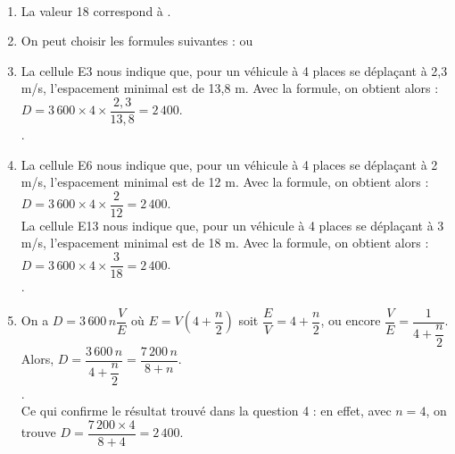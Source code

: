 \ \\ [-5mm]
\begin{enumerate}
   \item La valeur 18 correspond à .
   \item On peut choisir les formules suivantes :  ou 
   \item La cellule E3 nous indique que, pour un véhicule à 4 places se déplaçant à 2,3 m/s, l'espacement minimal est de 13,8 m. Avec la formule, on obtient alors : $D =3\,600\times4\times\dfrac{2,3}{13,8} =2\,400$. \\
   .
   \item La cellule E6 nous indique que, pour un véhicule à 4 places se déplaçant à 2 m/s, l'espacement minimal est de 12 m. Avec la formule, on obtient alors : $D =3\,600\times4\times\dfrac{2}{12} =2\,400$. \\
   La cellule E13 nous indique que, pour un véhicule à 4 places se déplaçant à 3 m/s, l'espacement minimal est de 18 m. Avec la formule, on obtient alors : $D =3\,600\times4\times\dfrac{3}{18} =2\,400$. \\ [1mm]
   .
   \item On a $D =3\,600\,n\dfrac{V}{E}$ où $E =V\left(4+\dfrac{n}{2}\right)$ soit $\dfrac{E}{V} =4+\dfrac{n}{2}$, ou encore $\dfrac{V}{E} =\dfrac{1}{4+\dfrac{n}{2}}$. \\
   Alors, $D =\dfrac{3\,600\,n}{4+\dfrac{n}{2}} =\dfrac{7\,200\,n}{8+n}$. \\ [1mm]
   . \\
   Ce qui confirme le résultat trouvé dans la question 4 : en effet, avec $n=4$, on trouve $D =\dfrac{7\,200\times4}{8+4} =2\,400$.
\end{enumerate}
